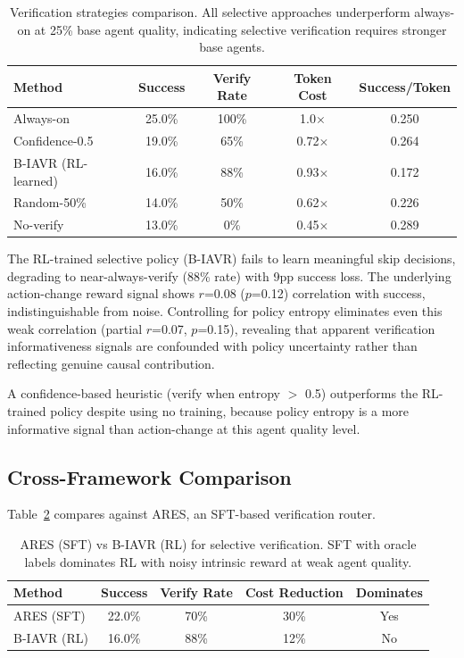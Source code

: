 \documentclass{article}
\begin{document}
\begin{table}[h]
\centering
\caption{Verification strategies comparison. All selective approaches underperform always-on at 25\% base agent quality, indicating selective verification requires stronger base agents.}
\label{tab:verify}
\begin{tabular}{lcccc}
\toprule
Method & Success & Verify Rate & Token Cost & Success/Token \\
\midrule
Always-on & 25.0\% & 100\% & 1.0$\times$ & 0.250 \\
Confidence-0.5 & 19.0\% & 65\% & 0.72$\times$ & 0.264 \\
B-IAVR (RL-learned) & 16.0\% & 88\% & 0.93$\times$ & 0.172 \\
Random-50\% & 14.0\% & 50\% & 0.62$\times$ & 0.226 \\
No-verify & 13.0\% & 0\% & 0.45$\times$ & 0.289 \\
\bottomrule
\end{tabular}
\end{table}

The RL-trained selective policy (B-IAVR) fails to learn meaningful skip decisions, degrading to near-always-verify (88\% rate) with 9pp success loss. The underlying action-change reward signal shows $r$=0.08 ($p$=0.12) correlation with success, indistinguishable from noise. Controlling for policy entropy eliminates even this weak correlation (partial $r$=0.07, $p$=0.15), revealing that apparent verification informativeness signals are confounded with policy uncertainty rather than reflecting genuine causal contribution.

A confidence-based heuristic (verify when entropy $>$ 0.5) outperforms the RL-trained policy despite using no training, because policy entropy is a more informative signal than action-change at this agent quality level.

\subsection{Cross-Framework Comparison}

Table~\ref{tab:ares} compares against ARES, an SFT-based verification router.

\begin{table}[h]
\centering
\caption{ARES (SFT) vs B-IAVR (RL) for selective verification. SFT with oracle labels dominates RL with noisy intrinsic reward at weak agent quality.}
\label{tab:ares}
\begin{tabular}{lcccc}
\toprule
Method & Success & Verify Rate & Cost Reduction & Dominates \\
\midrule
ARES (SFT) & 22.0\% & 70\% & 30\% & Yes \\
B-IAVR (RL) & 16.0\% & 88\% & 12\% & No \\
\bottomrule
\end{tabular}
\end{table}
\end{document}
